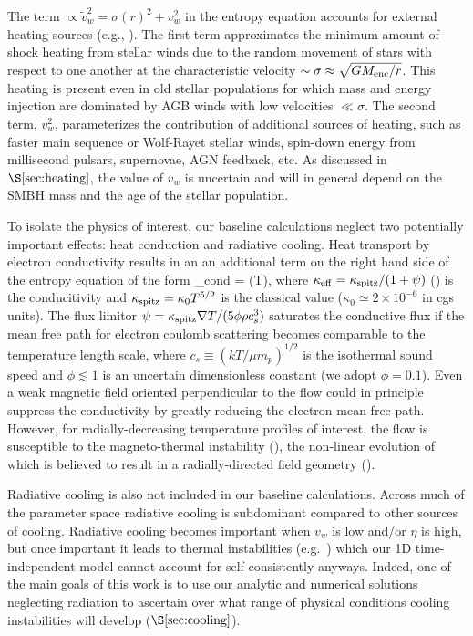 \documentclass[usenatbib,fleqn]{mn2e}
\newcommand{\vw}{\tilde{v}_{w}}
\newcommand{\vwO}{v_{w}}
\begin{document}
The term $\propto \vw^2 = \sigma(r)^2+v_{w}^2$ in the entropy
equation accounts for external heating sources (e.g.,
\citealt{ShcherbakovWong+:2014a}).  The first term approximates the
minimum amount of shock heating from stellar winds due to the random movement
of stars with respect to one another at the characteristic velocity
$\sim \sigma \approx \sqrt{GM_{\rm enc}/r}$.  This heating is present even in old stellar populations for which mass and energy injection are dominated by AGB winds with low velocities $\ll \sigma$.  The second term, $v_{w}^{2}$, parameterizes
the contribution of additional sources of heating, such as faster main
sequence or Wolf-Rayet stellar winds, spin-down energy from millisecond pulsars, supernovae, AGN
feedback, etc.  As discussed in $\S\ref{sec:heating}$, the value of
$v_{w}$ is uncertain and will in general depend on the SMBH mass and
the age of the stellar population.

To isolate the physics of interest, our baseline calculations neglect two potentially important effects: heat conduction and radiative cooling.  Heat transport by electron conductivity results in an an additional term on the right hand side of the entropy equation of the form  
\be {}_{\rm cond} = \nabla\cdot(\kappa \nabla T), \ee
where $\kappa_{\rm
  eff}=\kappa_{\rm spitz}/(1+\psi)$ (\citealt{DaltonBalbus:1993a}) is
the conducitivity and $\kappa_{\rm spitz} = \kappa_0 T^{5/2}$ is the
classical \citet{Spitzer62} value ($\kappa_0\simeq 2\times 10^{-6}$ in
cgs units).  The flux limitor $\psi = \kappa_{\rm spitz} \nabla
T/(5\phi \rho c_s^3)$ saturates the conductive flux if the mean free
path for electron coulomb scattering becomes comparable to the
temperature length scale, where $c_s \equiv (kT/\mu m_p)^{1/2}$ is the
isothermal sound speed and $\phi \lesssim 1$ is an uncertain
dimensionless constant (we adopt $\phi = 0.1$).  Even a weak magnetic
field oriented perpendicular to the flow could in principle suppress the
conductivity by greatly reducing the electron mean free path.  However, for radially-decreasing temperature profiles
of interest, the flow is susceptible to the magneto-thermal instability (\citealt{Balbus01}), the non-linear evolution of which is believed to result in a radially-directed field geometry (\citealt{Parrish&Stone07}).

Radiative cooling is also not included in our baseline calculations.  Across much of the parameter space radiative cooling is subdominant compared to other sources of cooling.  Radiative cooling becomes important when $\vwO$ is low and/or $\eta$ is high, but once important it leads to thermal instabilities (e.g.~\citealt{McCourt+12}) which our 1D
time-independent model cannot account for self-consistently anyways.  Indeed, one of the main goals of this work is to use our analytic and numerical solutions neglecting radiation to ascertain over what range of physical conditions cooling instabilities will develop ($\S\ref{sec:cooling}$).
\end{document}
